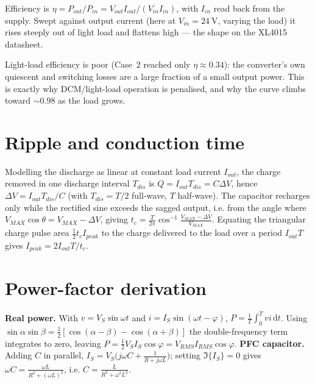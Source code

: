 \documentclass[11pt,a4paper,oneside]{book}
\begin{document}
Efficiency is $\eta=P_{out}/P_{in}=V_{out}I_{out}/(V_{in}I_{in})$, with $I_{in}$
read back from the supply. Swept against output current (here at
$V_{in}=\qty{24}{\volt}$, varying the load) it rises steeply out of light load and
flattens high --- the shape on the XL4015 datasheet.

\begin{center}
\end{center}

\begin{note}
Light-load efficiency is poor (Case~2 reached only $\eta\approx0.34$): the
converter's own quiescent and switching losses are a large fraction of a small
output power. This is exactly why DCM/light-load operation is penalised, and why
the curve climbs toward $\sim\!0.98$ as the load grows.
\end{note}

\appendix
\chapter{Ripple and conduction time}\label{app:ripple}
Modelling the discharge as linear at constant load current $I_{out}$, the charge
removed in one discharge interval $T_{dis}$ is $Q=I_{out}T_{dis}=C\Delta V$, hence
$\Delta V=I_{out}T_{dis}/C$ (with $T_{dis}=T/2$ full-wave, $T$ half-wave). The
capacitor recharges only while the rectified sine exceeds the sagged output, i.e.
from the angle where $V_{MAX}\cos\theta=V_{MAX}-\Delta V$, giving
$t_c=\frac{T}{2\pi}\cos^{-1}\frac{V_{MAX}-\Delta V}{V_{MAX}}$. Equating the
triangular charge pulse area $\tfrac12 t_c I_{peak}$ to the charge delivered to
the load over a period $I_{out}T$ gives $I_{peak}=2I_{out}T/t_c$.

\chapter{Power-factor derivation}\label{app:pf}
\textbf{Real power.} With $v=V_S\sin\omega t$ and $i=I_S\sin(\omega t-\varphi)$,
$P=\frac1T\int_0^T vi\,\mathrm dt$. Using
$\sin\alpha\sin\beta=\tfrac12[\cos(\alpha-\beta)-\cos(\alpha+\beta)]$ the
double-frequency term integrates to zero, leaving
$P=\tfrac12 V_S I_S\cos\varphi=V_{RMS}I_{RMS}\cos\varphi$. \textbf{PFC capacitor.}
Adding $C$ in parallel, $I_S=V_S\bigl(j\omega C+\frac1{R+j\omega L}\bigr)$; setting
$\Im\{I_S\}=0$ gives $\omega C=\frac{\omega L}{R^2+(\omega L)^2}$, i.e.
$C=\frac{L}{R^2+\omega^2L^2}$.
\end{document}
